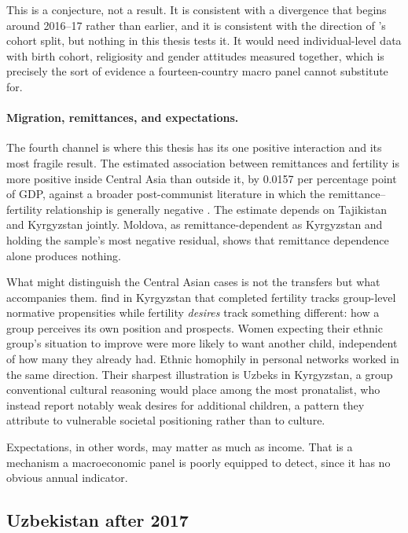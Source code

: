 This is a conjecture, not a result. It is consistent with a divergence that begins around 2016--17 rather than earlier, and it is consistent with the direction of \textcite{kumo2024}'s cohort split, but nothing in this thesis tests it. It would need individual-level data with birth cohort, religiosity and gender attitudes measured together, which is precisely the sort of evidence a fourteen-country macro panel cannot substitute for.

\paragraph{Migration, remittances, and expectations.} The fourth channel is where this thesis has its one positive interaction and its most fragile result. The estimated association between remittances and fertility is more positive inside Central Asia than outside it, by 0.0157 per percentage point of GDP, against a broader post-communist literature in which the remittance--fertility relationship is generally negative \parencite{tokhirov2024}. The estimate depends on Tajikistan and Kyrgyzstan jointly. Moldova, as remittance-dependent as Kyrgyzstan and holding the sample's most negative residual, shows that remittance dependence alone produces nothing.

What might distinguish the Central Asian cases is not the transfers but what accompanies them. \textcite{agadjanian2022} find in Kyrgyzstan that completed fertility tracks group-level normative propensities while fertility \emph{desires} track something different: how a group perceives its own position and prospects. Women expecting their ethnic group's situation to improve were more likely to want another child, independent of how many they already had. Ethnic homophily in personal networks worked in the same direction. Their sharpest illustration is Uzbeks in Kyrgyzstan, a group conventional cultural reasoning would place among the most pronatalist, who instead report notably weak desires for additional children, a pattern they attribute to vulnerable societal positioning rather than to culture.

Expectations, in other words, may matter as much as income. That is a mechanism a macroeconomic panel is poorly equipped to detect, since it has no obvious annual indicator.

\subsection{Uzbekistan after 2017}
\label{sec:uzbekistan}

